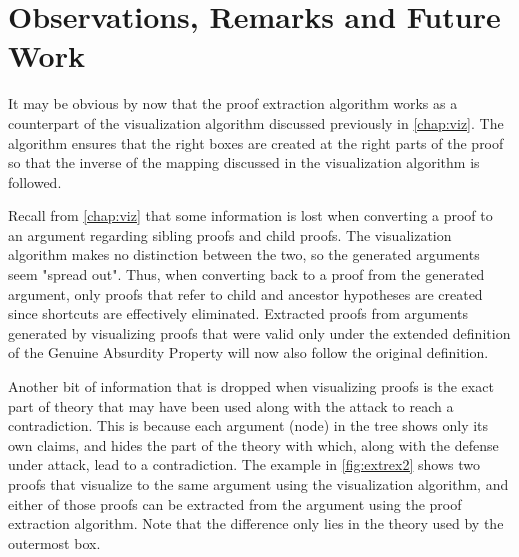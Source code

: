 \documentclass[11pt,twoside,a4paper]{report}
\begin{document}
\section{Observations, Remarks and Future Work}
\label{sec:proofmarks}
It may be obvious by now that the proof extraction algorithm works as a counterpart of the visualization algorithm discussed previously in \autoref{chap:viz}. The algorithm ensures that the right boxes are created at the right parts of the proof so that the inverse of the mapping discussed in the visualization algorithm is followed.

Recall from \autoref{chap:viz} that some information is lost when converting a proof to an argument regarding sibling proofs and child proofs. The visualization algorithm makes no distinction between the two, so the generated arguments seem "spread out". Thus, when converting back to a proof from the generated argument, only proofs that refer to child and ancestor hypotheses are created since shortcuts are effectively eliminated. Extracted proofs from arguments generated by visualizing proofs that were valid only under the extended definition of the Genuine Absurdity Property will now also follow the original definition.

Another bit of information that is dropped when visualizing proofs is the exact part of theory that may have been used along with the attack to reach a contradiction. This is because each argument (node) in the tree shows only its own claims, and hides the part of the theory with which, along with the defense under attack, lead to a contradiction. The example in \autoref{fig:extrex2} shows two proofs that visualize to the same argument using the visualization algorithm, and either of those proofs can be extracted from the argument using the proof extraction algorithm. Note that the difference only lies in the theory used by the outermost box.
\end{document}
